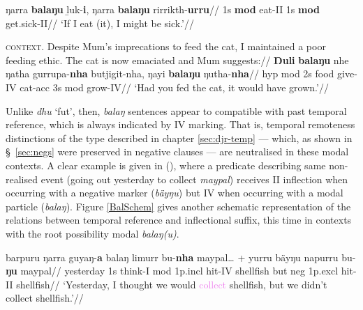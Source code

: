 \a\begingl\gla ŋarra \textbf{balaŋu} ḻuk-\textbf{i}, ŋarra \textbf{balaŋu} rirrikth-\textbf{urru}//
\glb 1s \textbf{\gls{mod}} eat-\gls{II} 1s \textbf{\gls{mod}} get.sick-\gls{II}//
\glft`If I eat (it), I might be sick.'//\endgl

\a\begingl\glpreamble \textsc{context.} Despite Mum's imprecations to feed the cat, I maintained a poor feeding ethic. The cat is now emaciated and Mum suggests://
\gla \textbf{Ŋuli} \textbf{balaŋu} nhe ŋatha gurrupa-\textbf{nha} butjigit-nha, ŋayi \textbf{balaŋu} ŋutha-\textbf{nha}//
\glb \gls{hyp} \gls{mod} 2s food give-\gls{IV} cat-\gls{acc} 3s \gls{mod} grow-\gls{IV}//
\glft`Had you fed the cat, it would have grown.'\trailingcitation{[DhG~20190405]}//\endgl

\xe


Unlike \textit{dhu} `\gls{fut}', then, \textit{balaŋ} sentences appear to compatible with past temporal reference, which is always indicated by \gls{IV} marking. That is, temporal remoteness distinctions of the type described in chapter \ref{sec:djr-temp} --- which, as shown in \S~\ref{sec:negs} were preserved in negative clauses --- are neutralised in these modal contexts. A clear example is given in (\nextx), where a predicate describing same non-realised event (going out \textsf{yesterday} to collect \textit{maypal}) receives \gls{II} inflection when occurring with a negative marker (\textit{bäyŋu}) but \gls{IV} when occurring with a modal particle (\textit{balaŋ}). Figure \ref{BalSchem} gives another schematic representation of the relations between temporal reference and inflectional suffix, this time in contexts with the root possibility modal \textit{balaŋ(u)}.



\pex
\begingl\gla barpuru ŋarra guyaŋ-\textbf{a} balaŋ limurr bu-\textbf{nha} maypal… + yurru bäyŋu napurru bu-\textbf{ŋu} maypal//
\glb yesterday 1s think-\gls{I} \gls{mod} 1p.\gls{incl} hit-\gls{IV} shellfish but \gls{neg} 1p.\gls{excl} hit-\gls{II} shellfish//
\glft`Yesterday, I \textcolor{forest}{thought} we would \textcolor{violet}{collect} shellfish, but we didn't \textcolor{ochre}{collect} shellfish.'\trailingcitation{[AW~20190429]}//\endgl\xe


